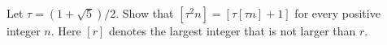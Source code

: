 Let $\tau = (1 + \sqrt{5})/2$. Show that $[\tau^2 n] = [\tau[\tau n] + 1]$ for
every positive integer $n$. Here $[r]$ denotes the largest integer that is not
larger than $r$.

